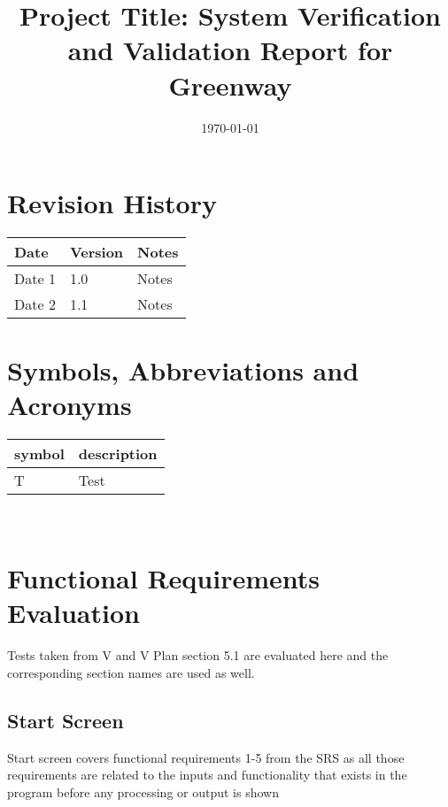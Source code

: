 \documentclass[12pt, titlepage]{article}
\begin{document}
\title{Project Title: System Verification and Validation Report for Greenway} 
\author{\authname{}}
\date{\today}
	
\maketitle


\tableofcontents

\newpage

\section{Revision History}

\begin{tabularx}{\textwidth}{p{3cm}p{2cm}X}
\toprule {\bf Date} & {\bf Version} & {\bf Notes}\\
\midrule
Date 1 & 1.0 & Notes\\
Date 2 & 1.1 & Notes\\
\bottomrule
\end{tabularx}

\section{Symbols, Abbreviations and Acronyms}

\renewcommand{\arraystretch}{1.2}
\begin{tabular}{l l} 
  \toprule		
  \textbf{symbol} & \textbf{description}\\
  \midrule 
  T & Test\\
  \bottomrule
\end{tabular}\\

\newpage


\newpage


\section{Functional Requirements Evaluation}
Tests taken from V and V Plan section 5.1 are evaluated here and the corresponding section names are used as well.

\subsection{Start Screen}

Start screen covers functional requirements 1-5 from the SRS as all those requirements 
are related to the inputs and functionality that exists in the program before any 
processing or output is shown
		
\end{document}
